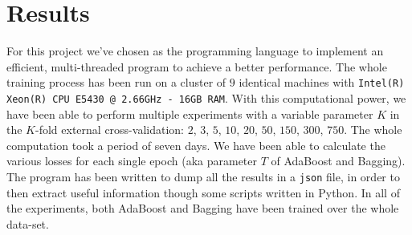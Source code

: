 
\chapter{Results}
\label{chap:results}
For this project we've chosen  as the programming language to implement an efficient, multi-threaded program to achieve a better performance. The whole training process has been run on a cluster of $9$ identical machines with \texttt{Intel(R) Xeon(R) CPU E5430 @ 2.66GHz - 16GB RAM}. With this computational power, we have been able to perform multiple experiments with a variable parameter $K$ in the $K$-fold external cross-validation: $2$, $3$, $5$, $10$, $20$, $50$, $150$, $300$, $750$. The whole computation took a period of seven days. We have been able to calculate the various losses for each single epoch (aka parameter $T$ of AdaBoost and Bagging).\\
The program has been written to dump all the results in a \texttt{json} file, in order to then extract useful information though some scripts written in Python. In all of the experiments, both AdaBoost and Bagging have been trained over the whole data-set.\\
